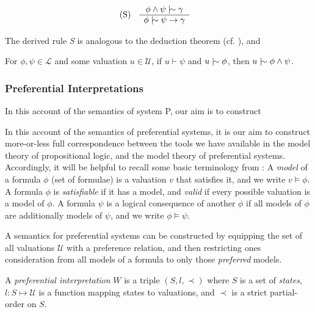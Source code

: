 \begin{align}
  \inferLeft{S}{\phi \land \psi \twiddle \gamma}{\phi \twiddle \psi \rightarrow \gamma}
\end{align}

The derived rule \textit{S} is analogous to the deduction theorem (cf. ), and

\begin{lemma}
  For $\phi, \psi \in \mathcal{L}$ and some valuation $u \in \mathcal{U}$, if $u \vdash \psi$ and $u \twiddle \phi$, then $u \twiddle \phi \land
  \psi$.
\end{lemma}

\subsubsection{Preferential Interpretations}
\label{subsubsection:preferential-interpretations}

In this account of the semantics of system P, our aim is to construct

In this account of the semantics of preferential systems, it is our aim to construct more-or-less full correspondence between the tools we have
available in the model theory of propositional logic, and the model theory of preferential systems. Accordingly, it will be helpful to
recall some basic terminology from : A \textit{model} of a formula $\phi$ (set of formulae) is a valuation
$v$ that satisfies it, and we write $v \vDash \phi$. A formula $\phi$ is \textit{satisfiable} if it has a model, and \textit{valid} if every
possible valuation is a model of $\phi$. A formula $\psi$ is a logical consequence of another $\phi$ if all models of $\phi$ are
additionally models of $\psi$, and we write $\phi \vDash \psi$.

A semantics for preferential systems can be constructed by equipping the set of all valuations $\mathcal{U}$ with a preference relation, and
then restricting ones consideration from all models of a formula to only those \textit{preferred} models.

\begin{definition}
  \label{definition:preferential-interpretation} A \emph{preferential interpretation} $W$ is a triple $(S, l, \prec)$ where $S$ is a set of
  \emph{states}, $l: S \mapsto \mathcal{U}$ is a function mapping states to valuations, and $\prec$ is a strict partial-order on $S$.
\end{definition}

